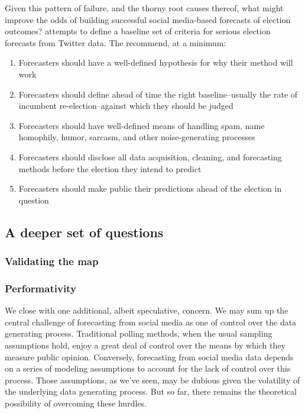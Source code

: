 \documentclass{article}
\begin{document}
Given this pattern of failure, and the thorny root causes thereof,
what might improve the odds of building successful social media-based
forecasts of election outcomes? \cite{gayo2012wanted} attempts to
define a baseline set of criteria for serious election forecasts from
Twitter data. The recommend, at a minimum:

\begin{enumerate}
\item Forecasters should have a well-defined hypothesis for why their
  method will work
\item Forecasters should define ahead of time the right
  baseline--usually the rate of incumbent re-election--against which
  they should be judged
\item Forecasters should have well-defined means of handling spam,
  name homophily, humor, sarcasm, and other noise-generating processes
\item Forecasters should disclose all data acquisition, cleaning, and
  forecasting methods before the election they intend to predict
\item Forecasters should make public their predictions ahead of the election in question
\end{enumerate}


\subsection{A deeper set of questions}
\label{sec:deeper-set-questions}

\subsubsection{Validating the map}
\label{sec:deeper-set-questions-1}

\subsubsection{Performativity}
\label{sec:performativity}

We close with one additional, albeit speculative, concern. We may sum
up the central challenge of forecasting from social media as one of
control over the data generating process. Traditional polling methods,
when the usual sampling assumptions hold, enjoy a great deal of
control over the means by which they measure public
opinion. Conversely, forecasting from social media data depends on a
series of modeling assumptions to account for the lack of control over
this process. Those assumptions, as we've seen, may be dubious given
the volatility of the underlying data generating process. But so far,
there remains the theoretical possibility of overcoming these
hurdles. 
\end{document}
